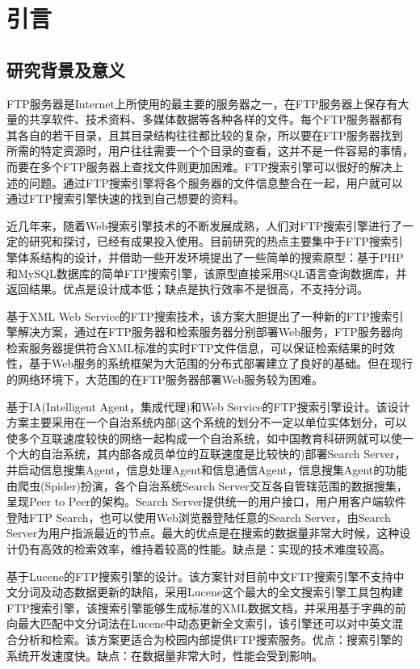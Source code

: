 
\chapter{引言}
\section{研究背景及意义}
FTP服务器是Internet上所使用的最主要的服务器之一，在FTP服务器上保存有大量的共享软件、技术资料、多媒体数据等各种各样的文件。每个FTP服务器都有其各自的若干目录，且其目录结构往往都比较的复杂，所以要在FTP服务器找到所需的特定资源时，用户往往需要一个个目录的查看，这并不是一件容易的事情，而要在多个FTP服务器上查找文件则更加困难。FTP搜索引擎可以很好的解决上述的问题。通过FTP搜索引擎将各个服务器的文件信息整合在一起，用户就可以通过FTP搜索引擎快速的找到自己想要的资料。

近几年来，随着Web搜索引擎技术的不断发展成熟，人们对FTP搜索引擎进行了一定的研究和探讨，已经有成果投入使用。目前研究的热点主要集中于FTP搜索引擎体系结构的设计，并借助一些开发环境提出了一些简单的搜索原型：基于PHP和MySQL数据库的简单FTP搜索引擎，该原型直接采用SQL语言查询数据库，并返回结果。优点是设计成本低；缺点是执行效率不是很高，不支持分词。

基于XML Web Service的FTP搜索技术，该方案大胆提出了一种新的FTP搜索引擎解决方案，通过在FTP服务器和检索服务器分别部署Web服务，FTP服务器向检索服务器提供符合XML标准的实时FTP文件信息，可以保证检索结果的时效性，基于Web服务的系统框架为大范围的分布式部署建立了良好的基础。但在现行的网络环境下，大范围的在FTP服务器部署Web服务较为困难。

基于IA(Intelligent Agent，集成代理)和Web Service的FTP搜索引擎设计。该设计方案主要采用在一个自治系统内部(这个系统的划分不一定以单位实体划分，可以使多个互联速度较快的网络一起构成一个自治系统，如中国教育科研网就可以使一个大的自治系统，其内部各成员单位的互联速度是比较快的)部署Search Server，并启动信息搜集Agent，信息处理Agent和信息通信Agent，信息搜集Agent的功能由爬虫(Spider)扮演，各个自治系统Search Server交互各自管辖范围的数据搜集，呈现Peer to Peer的架构。Search Server提供统一的用户接口，用户用客户端软件登陆FTP Search，也可以使用Web浏览器登陆任意的Search Server，由Search Server为用户指派最近的节点。最大的优点是在搜索的数据量非常大时候，这种设计仍有高效的检索效率，维持着较高的性能。缺点是：实现的技术难度较高。

基于Lucene的FTP搜索引擎的设计。该方案针对目前中文FTP搜索引擎不支持中文分词及动态数据更新的缺陷，采用Lucene这个最大的全文搜索引擎工具包构建FTP搜索引擎，该搜索引擎能够生成标准的XML数据文档，并采用基于字典的前向最大匹配中文分词法在Lucene中动态更新全文索引，该引擎还可以对中英文混合分析和检索。该方案更适合为校园内部提供FTP搜索服务。优点：搜索引擎的系统开发速度快。缺点：在数据量非常大时，性能会受到影响。
